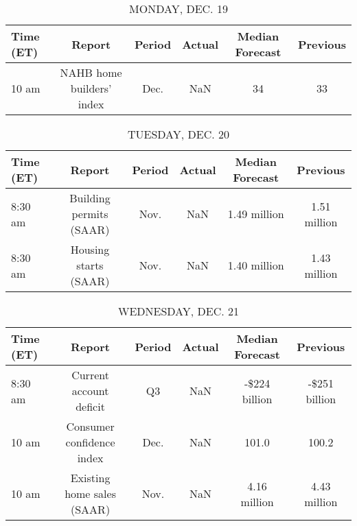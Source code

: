 \documentclass{article}%
\begin{document}
%
\normalsize%


\begin{table}[htbp]%
\caption{MONDAY, DEC. 19}%
\centering%
\begin{adjustbox}{width=1\textwidth}%
\begin{tabular}{lccccc}
\toprule
Time (ET) &                    Report & Period & Actual & Median Forecast & Previous \\
\midrule
    10 am & NAHB home builders' index &   Dec. &    NaN &              34 &       33 \\
\bottomrule
\end{tabular}
%
\end{adjustbox}%
\end{table}

%


\begin{table}[htbp]%
\caption{TUESDAY, DEC. 20}%
\centering%
\begin{adjustbox}{width=1\textwidth}%
\begin{tabular}{lccccc}
\toprule
Time (ET) &                  Report & Period & Actual & Median Forecast &     Previous \\
\midrule
  8:30 am & Building permits (SAAR) &   Nov. &    NaN &    1.49 million & 1.51 million \\
  8:30 am &   Housing starts (SAAR) &   Nov. &    NaN &    1.40 million & 1.43 million \\
\bottomrule
\end{tabular}
%
\end{adjustbox}%
\end{table}

%


\begin{table}[htbp]%
\caption{WEDNESDAY, DEC. 21}%
\centering%
\begin{adjustbox}{width=1\textwidth}%
\begin{tabular}{lccccc}
\toprule
Time (ET) &                     Report & Period & Actual & Median Forecast &      Previous \\
\midrule
  8:30 am &    Current account deficit &     Q3 &    NaN &   -\$224 billion & -\$251 billion \\
    10 am &  Consumer confidence index &   Dec. &    NaN &           101.0 &         100.2 \\
    10 am & Existing home sales (SAAR) &   Nov. &    NaN &    4.16 million &  4.43 million \\
\bottomrule
\end{tabular}
%
\end{adjustbox}%
\end{table}
\end{document}
